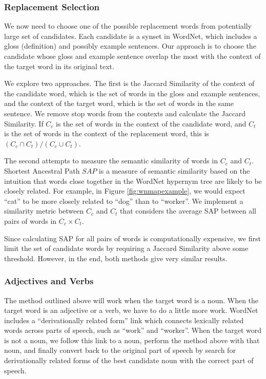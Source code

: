 \documentclass[12pt]{article}
\begin{document}
\subsubsection{Replacement Selection}

We now need to choose one of the possible replacement words from potentially large set of candidates. Each candidate is a synset in WordNet, which includes a gloss (definition) and possibly example sentences. Our approach is to choose the candidate whose gloss and example sentence overlap the most with the context of the target word in its original text.

We explore two approaches. The first is the Jaccard Similarity of the context of the candidate word, which is the set of words in the gloss and example sentences, and the context of the target word, which is the set of words in the same sentence. We remove stop words from the contexts and calculate the Jaccard Similarity. If $C_c$ is the set of words in the context of the candidate word, and $C_t$ is the set of words in the context of the replacement word, this is $(C_c \cap C_t) / (C_c \cup C_t)$.

The second attempts to measure the semantic similarity of words in $C_c$ and $C_t$. Shortest Ancestral Path \(SAP\) is a measure of semantic similarity based on the intuition that words close together in the WordNet hypernym tree are likely to be closely related. For example, in Figure \ref{fig:wnmapexample}, we would expect ``cat'' to be more closely related to ``dog'' than to ``worker''. We implement a similarity metric between $C_c$ and $C_t$ that considers the average SAP between all pairs of words in $C_c \times C_t$.

Since calculating SAP for all pairs of words is computationally expensive, we first limit the set of candidate words by requiring a Jaccard Similarity above some threshold. However, in the end, both methods give very similar results.

\subsubsection{Adjectives and Verbs}

The method outlined above will work when the target word is a noun. When the target word is an adjective or a verb, we have to do a little more work. WordNet includes a ``derivationally related form'' link which connects lexically related words across parts of speech, such as ``work'' and ``worker''. When the target word is not a noun, we follow this link to a noun, perform the method above with that noun, and finally convert back to the original part of speech by search for derivationally related forms of the best candidate noun with the correct part of speech.
\end{document}
